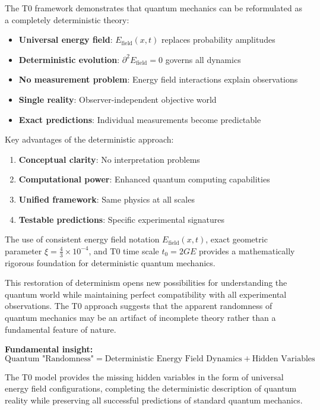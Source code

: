 \documentclass[12pt,a4paper]{report}
\begin{document}
The T0 framework demonstrates that quantum mechanics can be reformulated as a completely deterministic theory:

\begin{itemize}
	\item \textbf{Universal energy field}: $E_{\text{field}}(x,t)$ replaces probability amplitudes
	\item \textbf{Deterministic evolution}: $\partial^2 E_{\text{field}} = 0$ governs all dynamics
	\item \textbf{No measurement problem}: Energy field interactions explain observations
	\item \textbf{Single reality}: Observer-independent objective world
	\item \textbf{Exact predictions}: Individual measurements become predictable
\end{itemize}

Key advantages of the deterministic approach:
\begin{enumerate}
	\item \textbf{Conceptual clarity}: No interpretation problems
	\item \textbf{Computational power}: Enhanced quantum computing capabilities
	\item \textbf{Unified framework}: Same physics at all scales
	\item \textbf{Testable predictions}: Specific experimental signatures
\end{enumerate}

The use of consistent energy field notation $E_{\text{field}}(x,t)$, exact geometric parameter $\xi = \frac{4}{3} \times 10^{-4}$, and T0 time scale $t_0 = 2GE$ provides a mathematically rigorous foundation for deterministic quantum mechanics.

This restoration of determinism opens new possibilities for understanding the quantum world while maintaining perfect compatibility with all experimental observations. The T0 approach suggests that the apparent randomness of quantum mechanics may be an artifact of incomplete theory rather than a fundamental feature of nature.

\textbf{Fundamental insight:}
\begin{equation}
	\boxed{\text{Quantum "Randomness"} = \text{Deterministic Energy Field Dynamics} + \text{Hidden Variables}}
\end{equation}

The T0 model provides the missing hidden variables in the form of universal energy field configurations, completing the deterministic description of quantum reality while preserving all successful predictions of standard quantum mechanics.
\end{document}
